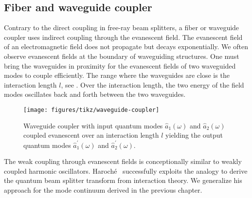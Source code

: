\subsection{Fiber and waveguide coupler}

Contrary to the direct coupling in free-ray beam splitters, a fiber or waveguide coupler uses indirect coupling through the evanescent field.
The evanescent field of an electromagnetic field does not propagate but decays exponentially.
We often observe evanescent fields at the boundary of waveguiding structures.
One must bring the waveguides in proximity for the evanescent fields of two waveguided modes to couple efficiently.
The range where the waveguides are close is the interaction length $l$, see .
Over the interaction length, the two energy of the field modes oscillates back and forth between the two waveguides.
\begin{figure}[htb]
    \centering
    \texttt{[image: figures/tikz/waveguide-coupler]}
    \caption{Waveguide coupler with input quantum modes $\hat{a}_1(\omega)$ and $\hat{a}_2(\omega)$ coupled evanescent over an interaction length $l$ yielding the output quantum modes $\hat{a}_1^\prime(\omega)$ and $\hat{a}_2^\prime(\omega)$.}\label{fig:waveguide_coupler}
\end{figure}
The weak coupling through evanescent fields is conceptionally similar to weakly coupled harmonic oscillators.
Haroché~\cite[p.~131]{Haroche2006} successfully exploits the analogy to derive the quantum beam splitter transform from interaction theory.
We generalize his approach for the mode continuum derived in the previous chapter.

